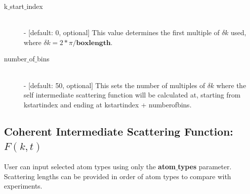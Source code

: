 \documentclass{article}
\begin{document}
\begin{description}
	\item[k$\_$start$\_$index] \hfill \\
	- [default: 0, optional] This value determines the first multiple of $\delta k$ used, where $\delta k = 2*\pi/\textbf{boxlength}$.  
	
	\item[number$\_$of$\_$bins] \hfill \\
	- [default: 50, optional] This sets the number of multiples of $\delta k$ where the self intermediate scattering function will be calculated at, starting from kstartindex and ending at kstartindex + numberofbins. 	
	
\end{description}

\subsection{Coherent Intermediate Scattering Function: $F(k,t)$} \label{sec::Fqt_parm}
User can input selected atom types using only the \textbf{atom$\_$types} parameter. Scattering lengths can be provided in order of atom types to compare with experiments.
\end{document}

